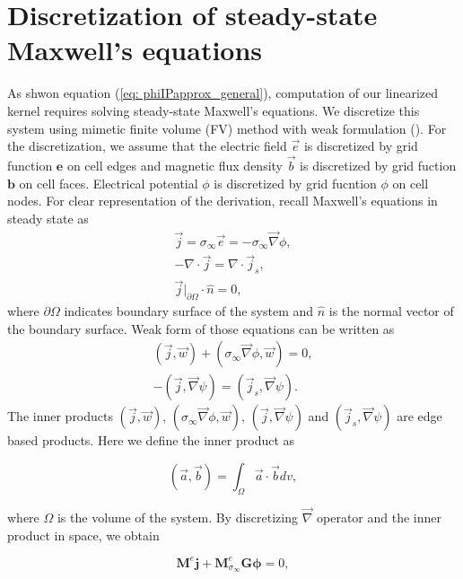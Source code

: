 \documentclass[extra,mreferee]{gji}
\renewcommand{\div}{\nabla\cdot}
\newcommand{\grad}{\vec \nabla}
\newcommand{\siginf}{\sigma_\infty}
\newcommand{\dgrad}{{\mathbf G}}
\newcommand{\M}{{\mathbf M}}
\newcommand{\MeSigInf}{{\M^e_{\sigma_\infty}}}
\newcommand{\Me}{{\M^e}}
\renewcommand {\j}  { {\vec j} }
\renewcommand {\b}  { {\vec b} }
\newcommand {\e}  { {\vec e} }
\renewcommand {\dj}  { {\mathbf{j} } }
\newcommand {\db}  { {\mathbf{b} } }
\newcommand {\de}  { {\mathbf{e} } }
\begin{document}
\appendix
\section{Discretization of steady-state Maxwell's equations}
\label{section:maxwell_discrete}
As shwon equation (\ref{eq: phiIPapprox_general}), computation of our linearized kernel requires solving steady-state Maxwell's equations. 
We discretize this system using mimetic finite volume (FV) method with weak formulation (\cite{Eldadbook}). 
For the discretization, we assume that the electric field $\e$ is discretized by grid function $\de$ on cell edges and magnetic flux density $\b$ is discretized by grid fuction $\db$ on cell faces. 
Electrical potential $\phi$ is discretized by grid fucntion  $\phi$ on cell nodes. For clear representation of the derivation, recall Maxwell's equations in steady state as
\begin{align}
  \j = \siginf\e = -\siginf\grad \phi, \\
  -\div \j = \div \j_s, \\
  \j\big|_{\partial \Omega}\cdot\hat{n} = 0,
  \label{eq:DCBCneumann}
\end{align}
where $\partial \Omega$ indicates boundary surface of the system and $\hat{n}$ is the normal vector of the boundary surface. Weak form of those equations can be written as
\begin{align}
  (\j, \vec{w}) + (\siginf \grad \phi, \vec{w}) = 0, \\
  -(\j, \grad \psi) = (\j_s, \grad \psi).
\end{align}
The inner products $(\j, \vec{w})$, $(\siginf \grad \phi, \vec{w})$,  $(\j, \grad \psi)$ and $(\j_s, \grad \psi)$ are edge based products. Here we define the inner product as
\begin{linenomath*}
\begin{equation}
  (\vec{a}, \vec{b}) = \int_{\Omega} \vec{a}\cdot\vec{b} dv,
\end{equation}
\end{linenomath*}
where $\Omega$ is the volume of the system. By discretizing $\grad$ operator and the inner product in space, we obtain
\begin{linenomath*}
\begin{equation}
  \Me\dj + \MeSigInf\dgrad\boldsymbol{\phi} = 0,
  \label{eq:DCdisceq1}
\end{equation}
\end{linenomath*}
\end{document}
